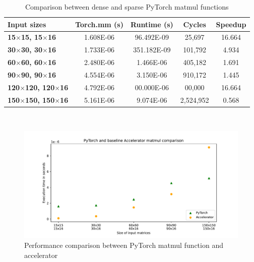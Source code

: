\begin{table}[t]
\centering
    \begin{tabular}{|p{9em} c c c c  |}
    \hline
    \textbf{Input sizes} & \textbf{Torch.mm (s)} & \textbf{Runtime (s)} & \textbf{Cycles} & \textbf{Speedup} \T\B \\
    \hline \hline
    \textbf{15$\times$15, 15$\times$16} & 1.608E-06  & 96.492E-09 & 25,697 & 16.664 \T\B\\
    \hline
    \textbf{30$\times$30, 30$\times$16} & 1.733E-06  & 351.182E-09 & 101,792 & 4.934 \T\B\\
    \hline
    \textbf{60$\times$60, 60$\times$16} & 2.480E-06  & 1.466E-06 & 405,182 & 1.691 \T\B\\
    \hline
    \textbf{90$\times$90, 90$\times$16} & 4.554E-06  & 3.150E-06 & 910,172 & 1.445 \T\B\\
    \hline
    \textbf{120$\times$120, 120$\times$16} & 4.792E-06  & 00.000E-06 & 00,000 & 16.664 \T\B\\
    \hline
    \textbf{150$\times$150, 150$\times$16} & 5.161E-06  & 9.074E-06 & 2,524,952 & 0.568 \T\B\\
    \hline
    \end{tabular}
    \\[10pt]
    \caption{Comparison between dense and sparse PyTorch matmul functions}
    \label{tab:pytorch-accelerator-comparison}
\end{table}

\begin{figure}[t]
    \centering
    \includegraphics[height=0.4\textwidth]{Images/matmul_comparison}
    \caption{Performance comparison between PyTorch matmul function and accelerator}
    \label{fig:pytorch-accelerator-comparison}
\end{figure}
